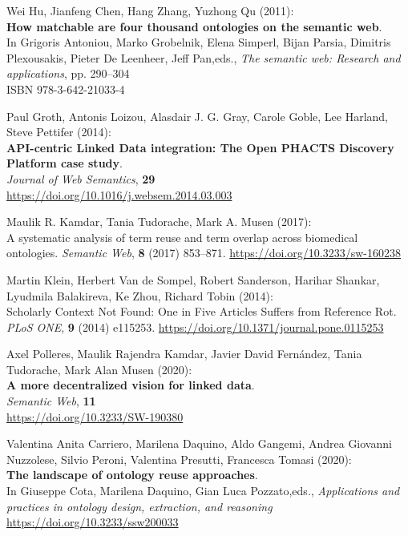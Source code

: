 \begin{thebibliography}{9}
Wei Hu, Jianfeng Chen, Hang Zhang, Yuzhong Qu (2011): \\
\textbf{How matchable are four thousand ontologies on the semantic web}. \\
In Grigoris
Antoniou, Marko Grobelnik, Elena Simperl, Bijan Parsia, Dimitris
Plexousakis, Pieter De Leenheer, Jeff Pan,eds., \emph{The semantic
web: {Research} and applications}, pp. 290--304 \\
ISBN 978-3-642-21033-4

Paul Groth, Antonis Loizou, Alasdair J. G. Gray, Carole Goble, Lee
Harland, Steve Pettifer (2014): \\
\textbf{API-centric Linked Data integration: {The Open PHACTS Discovery Platform} case study}.\\
\emph{Journal of Web Semantics}, \textbf{29} \\
\url{https://doi.org/10.1016/j.websem.2014.03.003}

Maulik R. Kamdar, Tania Tudorache, Mark A. Musen (2017): \\
A systematic
analysis of term reuse and term overlap across biomedical ontologies.
\emph{Semantic Web}, \textbf{8} (2017) 853--871.
\url{https://doi.org/10.3233/sw-160238}

Martin Klein, Herbert Van de Sompel, Robert Sanderson, Harihar Shankar,
Lyudmila Balakireva, Ke Zhou, Richard Tobin (2014): \\
Scholarly
{Context Not Found}: {One} in {Five Articles Suffers} from {Reference
Rot}. \emph{PLoS ONE}, \textbf{9} (2014) e115253.
\url{https://doi.org/10.1371/journal.pone.0115253}

Axel Polleres, Maulik Rajendra Kamdar, Javier David Fernández, Tania
Tudorache, Mark Alan Musen (2020): \\
\textbf{A more decentralized vision for linked data}.\\ 
\emph{Semantic Web}, \textbf{11} \\
\url{https://doi.org/10.3233/SW-190380}

Valentina Anita Carriero, Marilena Daquino, Aldo Gangemi, Andrea
Giovanni Nuzzolese, Silvio Peroni, Valentina Presutti, Francesca
Tomasi (2020): \\
\textbf{The landscape of ontology reuse approaches}. \\
In Giuseppe Cota, Marilena Daquino, Gian Luca Pozzato,eds.,
\emph{Applications and practices in ontology design, extraction, and
reasoning} \\
\url{https://doi.org/10.3233/ssw200033}


\end{thebibliography}

